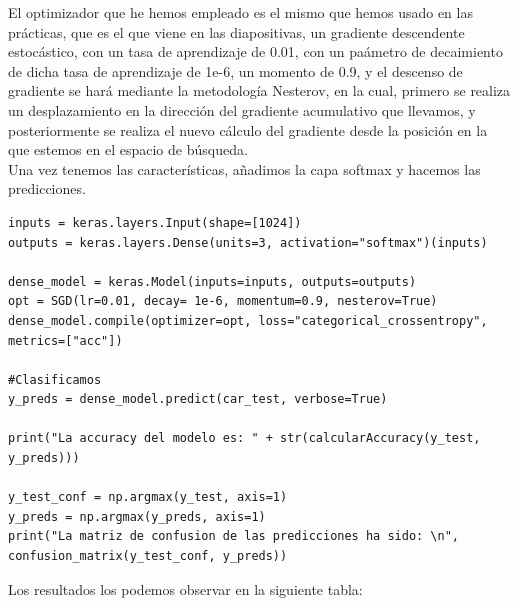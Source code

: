 \documentclass[11pt,a4paper]{article}
\theoremstyle{definition}
\begin{document}
El optimizador que he hemos empleado es el mismo que hemos usado en las prácticas, que es el que viene en las diapositivas, un gradiente descendente estocástico, con un tasa de aprendizaje de 0.01, con un paámetro de decaimiento de dicha tasa de aprendizaje de 1e-6, un momento de 0.9, y el descenso de gradiente se hará mediante la metodología Nesterov, en la cual, primero se realiza un desplazamiento en la dirección del gradiente acumulativo que llevamos, y posteriormente se realiza el nuevo cálculo del gradiente desde la posición en la que estemos en el espacio de búsqueda.\\

Una vez tenemos las características, añadimos la capa softmax y hacemos las predicciones.

\begin{lstlisting}
inputs = keras.layers.Input(shape=[1024])
outputs = keras.layers.Dense(units=3, activation="softmax")(inputs)

dense_model = keras.Model(inputs=inputs, outputs=outputs)
opt = SGD(lr=0.01, decay= 1e-6, momentum=0.9, nesterov=True)
dense_model.compile(optimizer=opt, loss="categorical_crossentropy", metrics=["acc"])

#Clasificamos
y_preds = dense_model.predict(car_test, verbose=True)

print("La accuracy del modelo es: " + str(calcularAccuracy(y_test, y_preds)))

y_test_conf = np.argmax(y_test, axis=1)
y_preds = np.argmax(y_preds, axis=1)
print("La matriz de confusion de las predicciones ha sido: \n", confusion_matrix(y_test_conf, y_preds))
\end{lstlisting}


Los resultados los podemos observar en la siguiente tabla:
\end{document}

